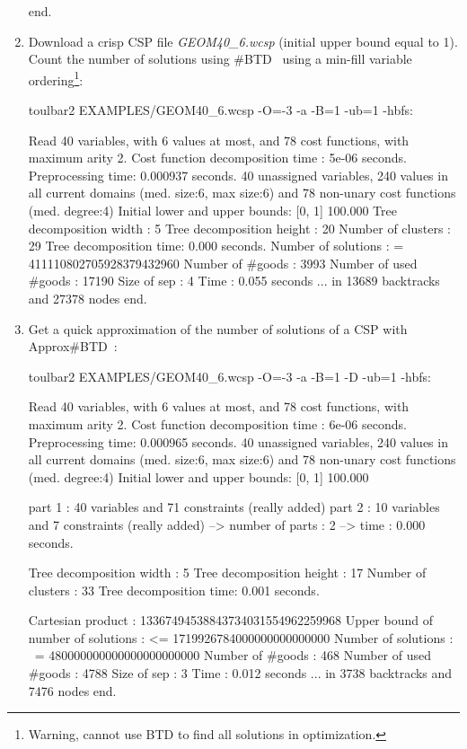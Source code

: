 \begin{enumerate}
{\begin{DoxyCode}
end.
\end{DoxyCode}}
\item Download a crisp CSP file {\em GEOM40\_6.wcsp} (initial upper bound equal to 1). Count the number of solutions using \#BTD~\cite{Favier09a} using a min-fill variable ordering\footnote{Warning, cannot use BTD to find all solutions in optimization.}:
\begin{DoxyCode}
	toulbar2 EXAMPLES/GEOM40_6.wcsp -O=-3 -a -B=1 -ub=1 -hbfs:
\end{DoxyCode}
{\scriptsize
\begin{DoxyCode}
Read 40 variables, with 6 values at most, and 78 cost functions, with maximum arity 2.
Cost function decomposition time : 5e-06 seconds.
Preprocessing time: 0.000937 seconds.
40 unassigned variables, 240 values in all current domains (med. size:6, max size:6) and 78 non-unary cost functions (med. degree:4)
Initial lower and upper bounds: [0, 1] 100.000%
Tree decomposition width  : 5
Tree decomposition height : 20
Number of clusters        : 29
Tree decomposition time: 0.000 seconds.
Number of solutions    : =  411110802705928379432960
Number of #goods       :    3993
Number of used #goods  :    17190
Size of sep            :    4
Time                   :    0.055 seconds
... in 13689 backtracks and 27378 nodes
end.
\end{DoxyCode}}
\item Get a quick approximation of the number of solutions of a CSP with Approx\#BTD~\cite{Favier09a}:
\begin{DoxyCode}
	toulbar2 EXAMPLES/GEOM40_6.wcsp -O=-3 -a -B=1 -D -ub=1 -hbfs:
\end{DoxyCode}
{\scriptsize
\begin{DoxyCode}
Read 40 variables, with 6 values at most, and 78 cost functions, with maximum arity 2.
Cost function decomposition time : 6e-06 seconds.
Preprocessing time: 0.000965 seconds.
40 unassigned variables, 240 values in all current domains (med. size:6, max size:6) and 78 non-unary cost functions (med. degree:4)
Initial lower and upper bounds: [0, 1] 100.000%

part 1 : 40 variables and 71 constraints (really added)
part 2 : 10 variables and 7 constraints (really added)
--> number of parts : 2
--> time : 0.000 seconds. 

Tree decomposition width  : 5
Tree decomposition height : 17
Number of clusters        : 33
Tree decomposition time: 0.001 seconds.

Cartesian product 		   :    13367494538843734031554962259968
Upper bound of number of solutions : <= 1719926784000000000000000
Number of solutions    : ~= 480000000000000000000000
Number of #goods       :    468
Number of used #goods  :    4788
Size of sep            :    3
Time                   :    0.012 seconds
... in 3738 backtracks and 7476 nodes
end.
\end{DoxyCode}}
\end{enumerate}
